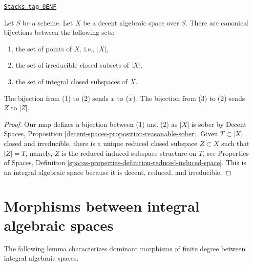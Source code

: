\begin{lemma}
\label{spaces-over-fields-lemma-decent-irreducible-closed}
\href{https://stacks.math.columbia.edu/tag/0ENF}{\texttt{Stacks tag 0ENF}}

Let $S$ be a scheme. Let $X$ be a decent algebraic space over $S$.
There are canonical bijections between the following sets:
\begin{enumerate}
\item the set of points of $X$, i.e., $|X|$,
\item the set of irreducible closed subsets of $|X|$,
\item the set of integral closed subspaces of $X$.
\end{enumerate}
The bijection from (1) to (2) sends $x$ to $\overline{\{x\}}$.
The bijection from (3) to (2) sends $Z$ to $|Z|$.
\end{lemma}

\begin{proof}
Our map defines a bijection between (1) and (2) as $|X|$ is
sober by
Decent Spaces, Proposition \ref{decent-spaces-proposition-reasonable-sober}.
Given $T \subset |X|$ closed and irreducible, there is a
unique reduced closed subspace $Z \subset X$ such that
$|Z| = T$, namely, $Z$ is the reduced induced subspace structure
on $T$, see Properties of Spaces, Definition
\ref{spaces-properties-definition-reduced-induced-space}.
This is an integral algebraic space because it is decent,
reduced, and irreducible.
\end{proof}

\section{Morphisms between integral algebraic spaces}
\label{spaces-over-fields-section-morphisms-between-integral-spaces}
The following lemma characterizes dominant morphisms of finite degree
between integral algebraic spaces.

